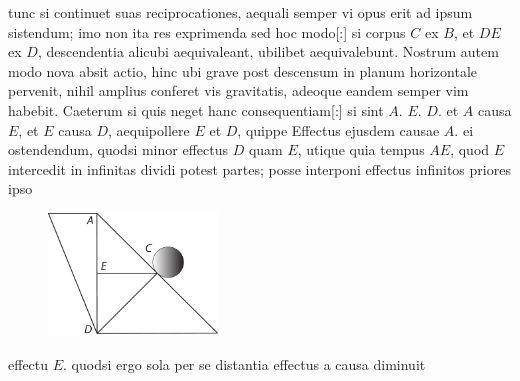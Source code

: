 tunc si continuet suas reciprocationes, aequali semper vi opus erit ad ipsum sistendum;
imo non ita res exprimenda sed hoc modo[:]
si corpus $\displaystyle C$ ex $\displaystyle B$, et $\displaystyle DE$ ex $\displaystyle D$,
descendentia alicubi aequivaleant, ubilibet aequivalebunt.
Nostrum autem 
modo nova absit actio\protect{}, hinc ubi grave\protect{} post descensum\protect{} in planum horizontale pervenit,
nihil amplius conferet vis gravitatis\protect{}, adeoque eandem semper vim habebit.
\pend
\pstart
Caeterum si quis neget hanc consequentiam[:]
si sint $\displaystyle A$. $\displaystyle E$. $\displaystyle D$.
et $\displaystyle A$ causa\protect{} $\displaystyle E$, et $\displaystyle E$ causa $\displaystyle D$,
aequipollere $\displaystyle E$ et $\displaystyle D$,
quippe Effectus\protect{} ejusdem causae\protect{} $\displaystyle A.$
ei ostendendum, quodsi minor effectus $\displaystyle D$ quam $\displaystyle E$,
utique quia tempus $\displaystyle AE$, quod
$\displaystyle E$ intercedit in infinitas\protect{} dividi potest partes;
posse interponi effectus infinitos\protect{} priores ipso
\begin{figure}
\includegraphics[trim = 0mm -3mm -5mm 0mm, clip, width=0.4\textwidth]{images/LH037,04_061v-d2.pdf}\\
\noindent
{}%
\end{figure} 
effectu $\displaystyle E$.
quodsi ergo sola per se distantia effectus a causa\protect{} diminuit
